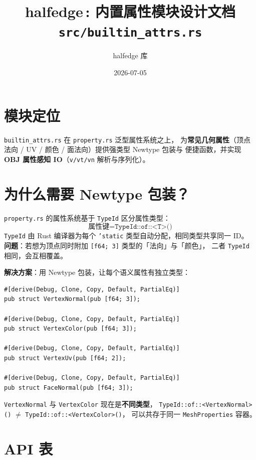 \documentclass[11pt,a4paper]{article}
\title{\textbf{halfedge\,: 内置属性模块设计文档} \\ \large \texttt{src/builtin\_attrs.rs}}
\author{halfedge 库}
\date{2026-07-05}
\begin{document}
\maketitle
\tableofcontents

\section{模块定位}

\texttt{builtin\_attrs.rs} 在 \texttt{property.rs} 泛型属性系统之上，
为\textbf{常见几何属性}（顶点法向 / UV / 颜色 / 面法向）提供强类型 Newtype 包装与
便捷函数，并实现\textbf{OBJ 属性感知 IO}（\texttt{v/vt/vn} 解析与序列化）。

\section{为什么需要 Newtype 包装？}

\texttt{property.rs} 的属性系统基于 \texttt{TypeId} 区分属性类型：
\[
  \text{属性键} = \texttt{TypeId::of::<T>()}
\]
\texttt{TypeId} 由 Rust 编译器为每个 \texttt{'static} 类型自动分配，相同类型共享同一 ID。
\textbf{问题}：若想为顶点同时附加 \texttt{[f64; 3]} 类型的「法向」与「颜色」，
二者 \texttt{TypeId} 相同，会互相覆盖。

\textbf{解决方案}：用 Newtype 包装，让每个语义属性有独立类型：

\begin{lstlisting}
#[derive(Debug, Clone, Copy, Default, PartialEq)]
pub struct VertexNormal(pub [f64; 3]);

#[derive(Debug, Clone, Copy, Default, PartialEq)]
pub struct VertexColor(pub [f64; 3]);

#[derive(Debug, Clone, Copy, Default, PartialEq)]
pub struct VertexUv(pub [f64; 2]);

#[derive(Debug, Clone, Copy, Default, PartialEq)]
pub struct FaceNormal(pub [f64; 3]);
\end{lstlisting}

\begin{sloppypar}
\texttt{VertexNormal} 与 \texttt{VertexColor} 现在是\textbf{不同类型}，
\texttt{TypeId::of::<VertexNormal>()} $\ne$ \texttt{TypeId::of::<VertexColor>()}，
可以共存于同一 \texttt{MeshProperties} 容器。
\end{sloppypar}

\section{API 表}
\end{document}
